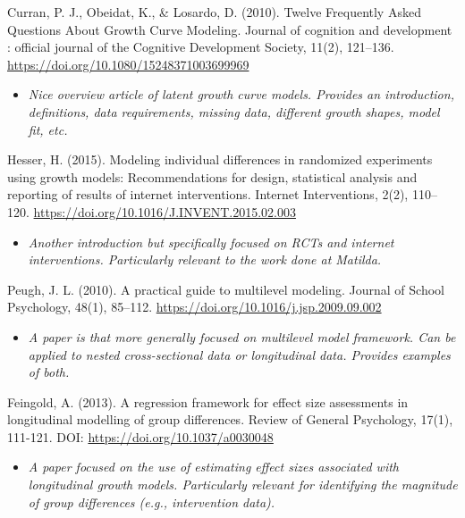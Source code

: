 \documentclass[
]{book}
\providecommand{\tightlist}{%
  \setlength{\itemsep}{0pt}\setlength{\parskip}{0pt}}
\begin{document}
Curran, P. J., Obeidat, K., \& Losardo, D. (2010). Twelve Frequently Asked Questions About Growth Curve Modeling. Journal of cognition and development : official journal of the Cognitive Development Society, 11(2), 121--136. \url{https://doi.org/10.1080/15248371003699969}

\begin{itemize}
\tightlist
\item
  \emph{Nice overview article of latent growth curve models. Provides an introduction, definitions, data requirements, missing data, different growth shapes, model fit, etc. }
\end{itemize}

Hesser, H. (2015). Modeling individual differences in randomized experiments using growth models: Recommendations for design, statistical analysis and reporting of results of internet interventions. Internet Interventions, 2(2), 110--120. \url{https://doi.org/10.1016/J.INVENT.2015.02.003}

\begin{itemize}
\tightlist
\item
  \emph{Another introduction but specifically focused on RCTs and internet interventions. Particularly relevant to the work done at Matilda.}
\end{itemize}

Peugh, J. L. (2010). A practical guide to multilevel modeling. Journal of School Psychology, 48(1), 85--112. \url{https://doi.org/10.1016/j.jsp.2009.09.002}

\begin{itemize}
\tightlist
\item
  \emph{A paper is that more generally focused on multilevel model framework. Can be applied to nested cross-sectional data or longitudinal data. Provides examples of both. }
\end{itemize}

Feingold, A. (2013). A regression framework for effect size assessments in longitudinal modelling of group differences. Review of General Psychology, 17(1), 111-121. DOI: \url{https://doi.org/10.1037/a0030048}

\begin{itemize}
\tightlist
\item
  \emph{A paper focused on the use of estimating effect sizes associated with longitudinal growth models. Particularly relevant for identifying the magnitude of group differences (e.g., intervention data).}
\end{itemize}
\end{document}
